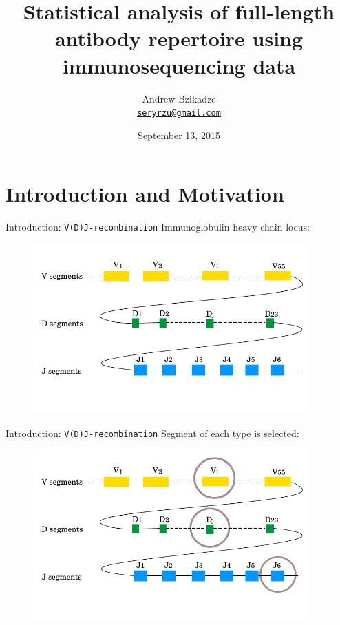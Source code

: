 \documentclass{beamer}\usepackage[]{graphicx}\usepackage[]{color}
\title[Statistical analysis of an antibody repertoire]{Statistical analysis of full-length antibody repertoire using immunosequencing data}
\author [Andrew Bzikadze]{Andrew Bzikadze\\ \texttt{\small{\href{mailto:seryrzu@gmail.com}{seryrzu@gmail.com}}}}
\date {
September 13, 2015
}
\begin{document}
\begin{frame}
  \titlepage
\end{frame}

\section{Introduction and Motivation}

\begin{frame}{Introduction: \texttt{V(D)J-recombination}}
  Immunoglobulin heavy chain locus:
  \begin{figure}[h]
    \center\includegraphics[width=300pt]{Pictures/vdj1.pdf}
 \end{figure}
\end{frame}

\begin{frame}{Introduction: \texttt{V(D)J-recombination}}
  Segment of each type is selected: 
  \begin{figure}[h]
    \center\includegraphics[width=300pt]{Pictures/vdj2_select_genes.pdf}
 \end{figure}
\end{frame}
\end{document}
